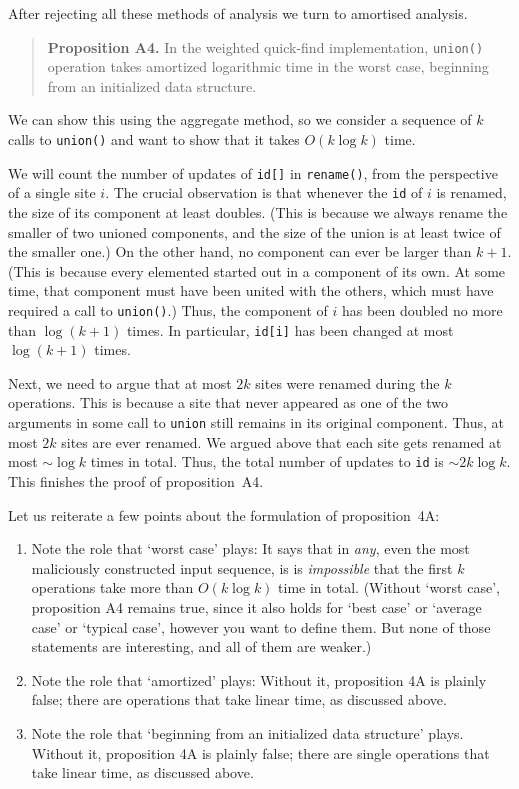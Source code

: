 \documentclass{tufte-handout}
\begin{document}
\medskip
After rejecting all these methods of analysis we turn to amortised analysis.

\begin{quote}
  {\bf Proposition A4.} In the weighted quick-find implementation, {\tt union()} operation takes amortized logarithmic time in the worst case, beginning from an initialized data structure.
\end{quote}

We can show this using the aggregate method, so we consider a sequence of $k$ calls to {\tt union()} and want to show that it takes $O(k\log k)$ time.

We will count the number of updates of {\tt id[]} in {\tt rename()}, from the perspective of a single site $i$. 
The crucial observation is that whenever the {\tt id} of $i$ is renamed, the size of its component at least doubles.
(This is because we always rename the smaller of two unioned components, and the size of the union is at least twice of the smaller one.)
On the other hand, no component can ever be larger than $k+1$. 
(This is because every elemented started out in a component of its own.
At some time, that component must have been united with the others, which must have required a call to {\tt union()}.)
Thus, the component of $i$ has been doubled no more than $\log (k+1)$ times.
In particular, {\tt id[i]} has been changed at most $\log (k+1)$ times.

Next, we need to argue that at most $2k$ sites were renamed during the $k$ operations.
This is because a site that never appeared as one of the two arguments in some call to {\tt union} still remains in its original component.
Thus, at most $2k$ sites are ever renamed.
We argued above that each site gets renamed at most $\sim\log k$ times in total.
Thus, the total number of updates to {\tt id} is $\sim 2k\log k$. 
This finishes the proof of proposition~A4.
\bigskip

Let us reiterate a few points about the formulation of proposition~4A:
\begin{enumerate}
  \item  Note the role that `worst case' plays:
    It says that in \emph{any}, even the most maliciously constructed input sequence, is is \emph{impossible} that the first $k$ operations take more than $O(k\log k)$ time in total.
    (Without `worst case', proposition A4 remains true, since it also holds for `best case' or `average case' or `typical case', however you want to define them.
    But none of those statements are interesting, and all of them are weaker.)
\item Note the role that `amortized' plays:
  Without it, proposition 4A is plainly false; there are operations that take linear time, as discussed above.
\item Note the role that `beginning from an initialized data structure' plays. 
  Without it, proposition 4A is plainly false; there are single operations that take linear time, as discussed above.
\end{enumerate}
\end{document}
